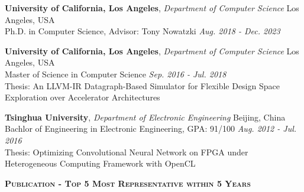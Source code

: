 \documentclass[a4paper]{article}
\newenvironment{changemargin}[2]{%
  \begin{list}{}{%
    \setlength{\topsep}{0pt}%
    \setlength{\leftmargin}{#1}%
    \setlength{\rightmargin}{#2}%
    \setlength{\listparindent}{\parindent}%
    \setlength{\itemindent}{\parindent}%
    \setlength{\parsep}{\parskip}%
  }%
  \item[]}{\end{list}
}
\newcommand{\lineover}{
	\begin{changemargin}{-0.05in}{-0.05in}
		\vspace*{-8pt}
		\hrulefill \\
		\vspace*{-2pt}
	\end{changemargin}
}
\newcommand{\header}[1]{
	\begin{changemargin}{-0.5in}{-0.5in}
		\scshape{\large \textbf{#1}}\\
  	\lineover
	\end{changemargin}
}
\newenvironment{body} {
	\vspace*{-16pt}
	\begin{changemargin}{-0.5in}{-0.5in}
  }	
	{\end{changemargin}
}
\begin{document}
\begin{body}
	\vspace{14pt}

	\textbf{University of California, Los Angeles}, \emph{Department of Computer Science} \hfill Los Angeles, USA \\
Ph.D. in Computer Science, Advisor: Tony Nowatzki \hfill \emph{Aug. 2018 - Dec. 2023} {} \\

\vspace{6pt}

	\textbf{University of California, Los Angeles}, \emph{Department of Computer Science} \hfill Los Angeles, USA \\
Master of Science in Computer Science \hfill \emph{Sep. 2016 - Jul. 2018}{} \\
Thesis: An LLVM-IR Datagraph-Based Simulator for Flexible Design Space Exploration over Accelerator Architectures \\

\vspace{6pt}

	\textbf{Tsinghua University}, \emph{Department of Electronic Engineering} \hfill Beijing, China \\
Bachlor of Engineering in Electronic Engineering, GPA: 91/100 \hfill \emph{Aug. 2012 - Jul. 2016}{} \\
Thesis: Optimizing Convolutional Neural Network on FPGA under Heterogeneous Computing Framework with OpenCL \\


\end{body}

\smallskip
\smallskip

\header{Publication - Top 5 Most Representative within 5 Years}
\end{document}
